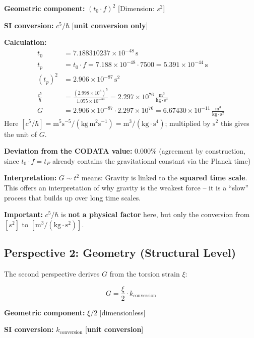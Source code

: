 	\textbf{Geometric component:} \((t_0 \cdot f)^2\) [Dimension: \(s^2\)]
	
	\textbf{SI conversion:} \(c^5/\hbar\) [\textbf{unit conversion only}]
	
	\textbf{Calculation:}
	\begin{align}
		t_0 &= 7.188310237 \times 10^{-48}\,\text{s} \\
		t_p &= t_0 \cdot f = 7.188 \times 10^{-48} \cdot 7500 = 5.391 \times 10^{-44}\,\text{s} \\
		(t_p)^2 &= 2.906 \times 10^{-87}\,\text{s}^2 \\
		\frac{c^5}{\hbar} &= \frac{(2.998 \times 10^8)^5}{1.055 \times 10^{-34}} = 2.297 \times 10^{76}\,\frac{\text{m}^3}{\text{kg} \cdot \text{s}^4} \\
		G &= 2.906 \times 10^{-87} \cdot 2.297 \times 10^{76} = 6.67430 \times 10^{-11}\,\frac{\text{m}^3}{\text{kg} \cdot \text{s}^2}
	\end{align}
	Here $[c^5/\hbar] = \text{m}^5\text{s}^{-5}/(\text{kg}\,\text{m}^2\text{s}^{-1}) = \text{m}^3/(\text{kg}\cdot\text{s}^4)$; multiplied by $\text{s}^2$ this gives the unit of $G$.
	
	\textbf{Deviation from the CODATA value:} \(0.000\%\) (agreement by construction, since \(t_0 \cdot f = t_P\) already contains the gravitational constant via the Planck time)
	
	\textbf{Interpretation:} \(G \sim t^2\) means: Gravity is linked to the \textbf{squared time scale}. This offers an interpretation of why gravity is the weakest force -- it is a \enquote{slow} process that builds up over long time scales.
	
	\textbf{Important:} \(c^5/\hbar\) is \textbf{not a physical factor} here, but only the conversion from \([s^2]\) to \([\text{m}^3/(\text{kg} \cdot \text{s}^2)]\).
	
	\subsection{Perspective 2: Geometry (Structural Level)}
	
	The second perspective derives \(G\) from the torsion strain \(\xi\):
	
	\begin{equation}
		\boxed{G = \frac{\xi}{2} \cdot k_{\text{conversion}}}
	\end{equation}
	
	\textbf{Geometric component:} \(\xi/2\) [dimensionless]
	
	\textbf{SI conversion:} \(k_{\text{conversion}}\) [\textbf{unit conversion}]
	
